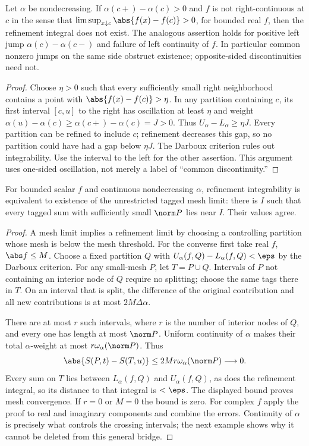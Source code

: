 \begin{proposition}
Let $\alpha$ be nondecreasing. If $\alpha(c+)-\alpha(c)>0$ and $f$ is not right-continuous at $c$ in the sense that $\limsup_{x\downarrow c}\abs{f(x)-f(c)}>0$, for bounded real $f$, then the refinement integral does not exist. The analogous assertion holds for positive left jump $\alpha(c)-\alpha(c-)$ and failure of left continuity of $f$. In particular common nonzero jumps on the same side obstruct existence; opposite-sided discontinuities need not.
\end{proposition}
\begin{proof}
Choose $\eta>0$ such that every sufficiently small right neighborhood contains a point with $\abs{f(x)-f(c)}>\eta$. In any partition containing $c$, its first interval $[c,u]$ to the right has oscillation at least $\eta$ and weight $\alpha(u)-\alpha(c)\geq\alpha(c+)-\alpha(c)=J>0$. Thus $U_\alpha-L_\alpha\geq\eta J$. Every partition can be refined to include $c$; refinement decreases this gap, so no partition could have had a gap below $\eta J$. The Darboux criterion rules out integrability. Use the interval to the left for the other assertion. This argument uses one-sided oscillation, not merely a label of ``common discontinuity.''
\end{proof}

\begin{theorem}
For bounded scalar $f$ and continuous nondecreasing $\alpha$, refinement integrability is equivalent to existence of the unrestricted tagged mesh limit: there is $I$ such that every tagged sum with sufficiently small $\norm P$ lies near $I$. Their values agree.
\end{theorem}
\begin{proof}
A mesh limit implies a refinement limit by choosing a controlling partition whose mesh is below the mesh threshold. For the converse first take real $f$, $\abs f\leq M$. Choose a fixed partition $Q$ with $U_\alpha(f,Q)-L_\alpha(f,Q)<\eps$ by the Darboux criterion. For any small-mesh $P$, let $T=P\cup Q$. Intervals of $P$ not containing an interior node of $Q$ require no splitting; choose the same tags there in $T$. On an interval that is split, the difference of the original contribution and all new contributions is at most $2M\Delta\alpha$.

There are at most $r$ such intervals, where $r$ is the number of interior nodes of $Q$, and every one has length at most $\norm P$. Uniform continuity of $\alpha$ makes their total $\alpha$-weight at most $r\omega_\alpha(\norm P)$. Thus
\[\abs{S(P,t)-S(T,u)}\leq2Mr\omega_\alpha(\norm P)\longrightarrow0.\]
Every sum on $T$ lies between $L_\alpha(f,Q)$ and $U_\alpha(f,Q)$, as does the refinement integral, so its distance to that integral is $<\eps$. The displayed bound proves mesh convergence. If $r=0$ or $M=0$ the bound is zero. For complex $f$ apply the proof to real and imaginary components and combine the errors. Continuity of $\alpha$ is precisely what controls the crossing intervals; the next example shows why it cannot be deleted from this general bridge.
\end{proof}

